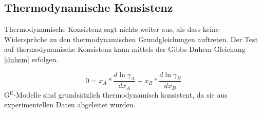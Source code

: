 \subsection{Thermodynamische Konsistenz}
Thermodynamische Konsistenz sagt nichts weiter aus, als dass keine Widersprüche zu den thermodynamischen Grundgleichungen auftreten. Der Test auf thermodynamische Konsistenz kann mittels der Gibbs-Duhem-Gleichung \eqref{duhem} erfolgen. 

\begin{equation}\label{duhem}
	0=x_A*\frac{d \ln\gamma_A}{dx_A}+x_B*\frac{d \ln\gamma_B}{dx_B}
\end{equation}
G$^\text{E}$-Modelle sind grundsätzlich thermodynamisch konsistent, da sie aus experimentellen Daten abgeleitet wurden.
